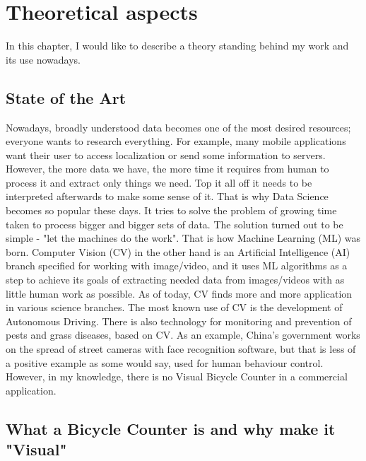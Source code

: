 \chapter{Theoretical aspects}
\label{cha:theorethicalAspects}

In this chapter, I would like to describe a theory standing behind my work and its use nowadays.


\section{State of the Art}
\label{sec:stateOfTheArt}

Nowadays, broadly understood data becomes one of the most desired resources; everyone wants to research everything. For example, many mobile applications want their user to access localization or send some information to servers. However, the more data we have, the more time it requires from human to process it and extract only things we need. Top it all off it needs to be interpreted afterwards to make some sense of it. That is why Data Science becomes so popular these days. It tries to solve the problem of growing time taken to process bigger and bigger sets of data. The solution turned out to be simple - "let the machines do the work". That is how Machine Learning (ML) was born. Computer Vision (CV) in the other hand is an Artificial Intelligence (AI) branch specified for working with image/video, and it uses ML algorithms as a step to achieve its goals of extracting needed data from images/videos with as little human work as possible. As of today, CV finds more and more application in various science branches. The most known use of CV is the development of Autonomous Driving. There is also technology for monitoring and prevention of pests and grass diseases\cite{appResearch}, based on CV. As an example, China's government works on the spread of street cameras with face recognition software, but that is less of a positive example as some would say, used for human behaviour control. However, in my knowledge, there is no Visual Bicycle Counter in a commercial application.



\section{What a Bicycle Counter is and why make it "Visual"}
\label{sec:why}

